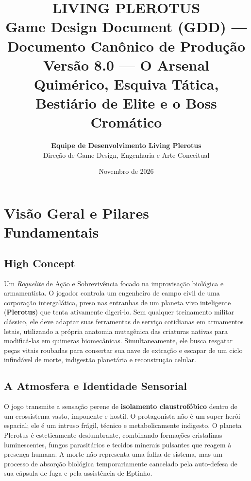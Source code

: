 \documentclass[a4paper,12pt]{report}
\title{\textbf{\Huge LIVING PLEROTUS}\\[0.4cm] 
\Large Game Design Document (GDD) --- Documento Canônico de Produção\\[0.3cm] 
\small Versão 8.0 --- O Arsenal Quimérico, Esquiva Tática, Bestiário de Elite e o Boss Cromático}
\author{\textbf{Equipe de Desenvolvimento Living Plerotus}\\ Direção de Game Design, Engenharia e Arte Conceitual}
\date{Novembro de 2026}
\begin{document}
\maketitle
\tableofcontents
\newpage

\chapter{Visão Geral e Pilares Fundamentais}

\section{High Concept}
Um \textit{Roguelite} de Ação e Sobrevivência focado na improvisação biológica e armamentista. O jogador controla um engenheiro de campo civil de uma corporação intergalática, preso nas entranhas de um planeta vivo inteligente (\textbf{Plerotus}) que tenta ativamente digeri-lo. Sem qualquer treinamento militar clássico, ele deve adaptar suas ferramentas de serviço cotidianas em armamentos letais, utilizando a própria anatomia mutagênica das criaturas nativas para modificá-las em quimeras biomecânicas. Simultaneamente, ele busca resgatar peças vitais roubadas para consertar sua nave de extração e escapar de um ciclo infindável de morte, indigestão planetária e reconstrução celular.

\section{A Atmosfera e Identidade Sensorial}
O jogo transmite a sensação perene de \textbf{isolamento claustrofóbico} dentro de um ecossistema vasto, imponente e hostil. O protagonista não é um super-herói espacial; ele é um intruso frágil, técnico e metabolicamente indigesto. O planeta Plerotus é esteticamente deslumbrante, combinando formações cristalinas luminescentes, fungos parasitários e tecidos minerais pulsantes que reagem à presença humana. A morte não representa uma falha de sistema, mas um processo de absorção biológica temporariamente cancelado pela auto-defesa de sua cápsula de fuga e pela assistência de Eptinho.
\end{document}
